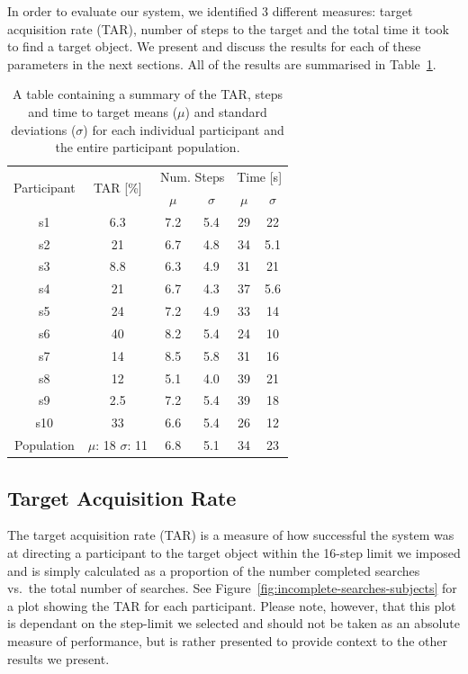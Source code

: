 \documentclass[a4paper, twoside]{article}
\begin{document}
\noindent In order to evaluate our system, we identified 3 different measures: target acquisition rate (TAR), number of steps to the target and the total time it took to find a target object. We present and discuss the results for each of these parameters in the next sections. All of the results are summarised in Table~\ref{tab:results-summary}.

\begin{table}
  \centering
  \caption{A table containing a summary of the TAR, steps and time to target means ($\mu$) and standard deviations ($\sigma$) for each individual participant and the entire participant population.}\label{tab:results-summary}
  \begin{tabular}{cc|cc|cc}
    \toprule
    \multirow{2}{*}{Participant} & \multirow{2}{*}{TAR [\%]} & \multicolumn{2}{c|}{Num. Steps} & \multicolumn{2}{c}{Time [s]} \\ 
				 &			     & $\mu$ & $\sigma$		       & $\mu$ & $\sigma$  \\ \midrule
    s1 & 6.3 & 7.2 & 5.4 & 29 & 22 \\ \midrule
    s2 & 21 & 6.7 & 4.8 & 34 & 5.1 \\ \midrule
    s3 & 8.8 & 6.3 & 4.9 & 31 & 21 \\ \midrule
    s4 & 21 & 6.7 & 4.3 & 37 & 5.6 \\ \midrule
    s5 & 24 & 7.2 & 4.9 & 33 & 14 \\ \midrule
    s6 & 40 & 8.2 & 5.4 & 24 & 10 \\ \midrule
    s7 & 14 & 8.5 & 5.8 & 31 & 16 \\ \midrule
    s8 & 12 & 5.1 & 4.0 & 39 & 21 \\ \midrule
    s9 & 2.5 & 7.2 & 5.4 & 39 & 18 \\ \midrule
    s10 & 33 & 6.6 & 5.4 & 26 & 12 \\ \midrule\midrule
    Population & $\mu$: 18 $\sigma$: 11 & 6.8 & 5.1 & 34 & 23 \\
    \bottomrule
  \end{tabular}
\end{table}

\subsection{Target Acquisition Rate}

\noindent The target acquisition rate (TAR) is a measure of how successful the system was at directing a participant to the target object within the 16-step limit we imposed and is simply calculated as a proportion of the number completed searches vs.\ the total number of searches. See Figure~\ref{fig:incomplete-searches-subjects} for a plot showing the TAR for each participant. Please note, however, that this plot is dependant on the step-limit we selected and should not be taken as an absolute measure of performance, but is rather presented to provide context to the other results we present. 
\end{document}
